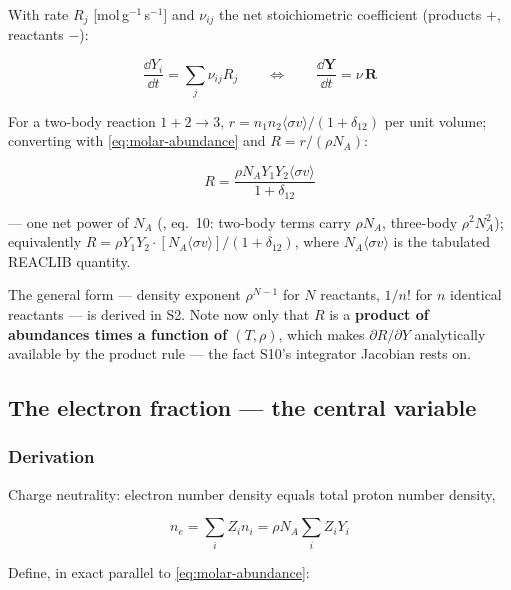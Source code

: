 With rate $R_j$ [mol\,g$^{-1}$\,s$^{-1}$] and $\nu_{ij}$ the net stoichiometric
coefficient (products $+$, reactants $-$):

\begin{equation}
\frac{\dd Y_i}{\dd t} = \sum_j \nu_{ij} R_j \qquad \iff \qquad
\frac{\dd\mathbf{Y}}{\dd t} = \nu\,\mathbf{R}
\label{eq:network-ode}
\end{equation}

For a two-body reaction $1 + 2 \to 3$,
$r = n_1n_2\langle\sigma v\rangle/(1+\delta_{12})$ per unit volume; converting
with \eqref{eq:molar-abundance} and $R = r/(\rho N_A)$:

\begin{equation*}
R = \frac{\rho N_A Y_1 Y_2 \langle\sigma v\rangle}{1+\delta_{12}}
\end{equation*}

--- one net power of $N_A$ (\citealt{hix1999b}, eq.~10: two-body terms carry
$\rho N_A$, three-body $\rho^2 N_A^2$); equivalently
$R = \rho Y_1 Y_2 \cdot [N_A\langle\sigma v\rangle]/(1+\delta_{12})$, where
$N_A\langle\sigma v\rangle$ is the tabulated REACLIB quantity.

The general form --- density exponent $\rho^{N-1}$ for $N$ reactants, $1/n!$
for $n$ identical reactants --- is derived in S2. Note now only that $R$ is a
\textbf{product of abundances times a function of $(T, \rho)$}, which makes
$\partial R/\partial Y$ analytically available by the product rule --- the fact
S10's integrator Jacobian rests on.

\subsection{The electron fraction \texorpdfstring{\Ye{}}{Ye} --- the central
  variable}
\label{sec:ye}

\subsubsection{Derivation}
\label{sec:yederivation}

Charge neutrality: electron number density equals total proton number density,

\begin{equation*}
n_e = \sum_i Z_i n_i = \rho N_A \sum_i Z_i Y_i
\end{equation*}

Define, in exact parallel to \eqref{eq:molar-abundance}:

